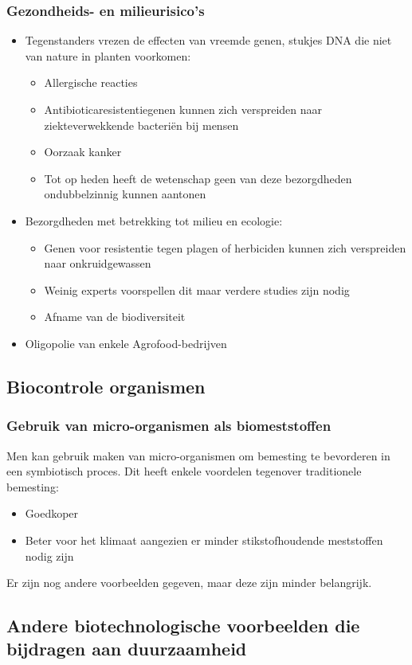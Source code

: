 \documentclass[a4paper,kul]{kulakarticle} %
\begin{document}
\subsubsection{Gezondheids- en milieurisico’s}
\begin{itemize}
	\item Tegenstanders vrezen de effecten van vreemde genen, stukjes
	DNA die niet van nature in planten voorkomen:
	\begin{itemize}
		\item Allergische reacties
		\item Antibioticaresistentiegenen kunnen zich verspreiden naar
		ziekteverwekkende bacteriën bij mensen
		\item Oorzaak kanker
		\item Tot op heden heeft de wetenschap geen van deze bezorgdheden ondubbelzinnig kunnen aantonen
	\end{itemize}
	\item Bezorgdheden met betrekking tot milieu en ecologie:
	\begin{itemize}
		\item Genen voor resistentie tegen plagen of herbiciden kunnen zich
		verspreiden naar onkruidgewassen
		\item Weinig experts voorspellen dit maar verdere studies zijn nodig
		\item Afname van de biodiversiteit
	\end{itemize}
	\item Oligopolie van enkele Agrofood-bedrijven
\end{itemize}
\subsection{Biocontrole organismen}
\subsubsection{Gebruik van micro-organismen als biomeststoffen}
Men kan gebruik maken van micro-organismen om bemesting te bevorderen in een symbiotisch proces. Dit heeft enkele voordelen tegenover traditionele bemesting:
\begin{itemize}
	\item Goedkoper
	\item Beter voor het klimaat aangezien er minder stikstofhoudende meststoffen nodig zijn
\end{itemize}
Er zijn nog andere voorbeelden gegeven, maar deze zijn minder belangrijk.
\newpage
\subsection{Andere biotechnologische voorbeelden die bijdragen aan duurzaamheid}
\end{document}
